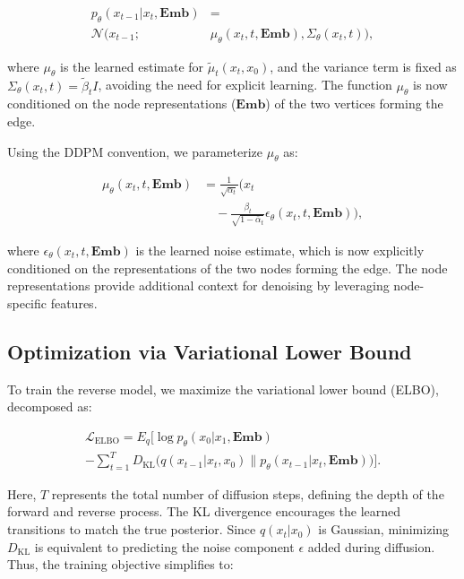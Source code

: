 \begin{align*}
    p_{\theta}(x_{t-1} | x_t, \mathbf{Emb}) &= \\
    \mathcal{N}\big(x_{t-1}; &\mu_{\theta}(x_t, t, \mathbf{Emb}), \Sigma_{\theta}(x_t, t)\big),
\end{align*}

where \( \mu_{\theta} \) is the learned estimate for \( \tilde{\mu}_t(x_t, x_0) \), and the variance term is fixed as \( \Sigma_{\theta}(x_t, t) = \tilde{\beta}_t I \), avoiding the need for explicit learning. The function \( \mu_{\theta} \) is now conditioned on the node representations (\(\mathbf{Emb}\)) of the two vertices forming the edge.

Using the DDPM convention, we parameterize \( \mu_{\theta} \) as:

\begin{align*}
    \mu_{\theta}(x_t, t, \mathbf{Emb}) &= \frac{1}{\sqrt{\alpha_t}} \Bigg( x_t \\
    &\quad - \frac{\beta_t}{\sqrt{1 - \bar{\alpha}_t}} \epsilon_{\theta}(x_t, t, \mathbf{Emb}) \Bigg),
\end{align*}

where \( \epsilon_{\theta}(x_t, t, \mathbf{Emb}) \) is the learned noise estimate, which is now explicitly conditioned on the representations of the two nodes forming the edge. The node representations provide additional context for denoising by leveraging node-specific features.

\subsection{Optimization via Variational Lower Bound}

To train the reverse model, we maximize the variational lower bound (ELBO), decomposed as:

\begin{align*}
    \mathcal{L}_{\text{ELBO}} = E_q \Bigg[
    \log p_{\theta}(x_0 | x_1, \mathbf{Emb}) \\
    - \sum_{t=1}^{T} D_{\text{KL}}\big(q(x_{t-1} | x_t, x_0) \| p_{\theta}(x_{t-1} | x_t, \mathbf{Emb})\big) 
    \Bigg].
\end{align*}

Here, \( T \) represents the total number of diffusion steps, defining the depth of the forward and reverse process. The KL divergence encourages the learned transitions to match the true posterior. Since \( q(x_t | x_0) \) is Gaussian, minimizing \( D_{\text{KL}} \) is equivalent to predicting the noise component \( \epsilon \) added during diffusion. Thus, the training objective simplifies to:

